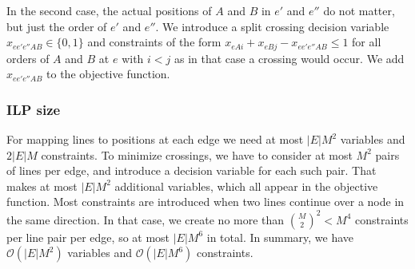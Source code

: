 \documentclass[sigconf]{acmart}
\begin{document}
In the second case, the actual positions of $A$ and $B$ in $e'$ and $e''$ do not matter, but just the order of $e'$ and $e''$. We introduce a split crossing decision variable $x_{ee'e''AB} \in \{0,1\}$ and constraints of the form $x_{eAi} + x_{eBj} - x_{ee'e''AB} \leq 1$ for all orders of $A$ and $B$ at $e$ with $i < j$ as in that case a crossing would occur.
We add $x_{ee'e''AB}$ to the objective function.

\subsubsection{ILP size}
For mapping lines to positions at each edge we need at most $|E|M^{2}$ variables and $2|E|M$ constraints. To minimize crossings, we have to consider at most $M^{2}$ pairs of lines per edge, and introduce a decision variable for each such pair. That makes at most $|E| M^{2}$ additional variables, which all appear in the objective function. Most constraints are introduced when two lines continue over a node in the same direction. In that case, we create no more than $\binom{M}{2}^{2} < M^{4}$ constraints per line pair per edge, so at most $|E| M^{6}$ in total.
In summary, we have $\mathcal{O}(|E|M^{2})$ variables and $\mathcal{O}(|E|M^{6})$ constraints.
\end{document}
